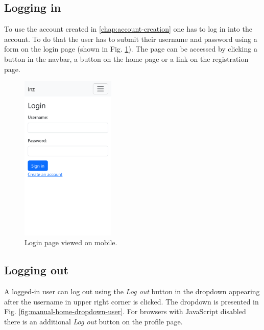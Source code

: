 \subsection{Logging in}

To use the account created in \ref{chap:account-creation} one has to log in into the account. To do that the user has to submit their username and password using a form on the login page (shown in Fig. \ref{fig:manual-login}). The page can be accessed by clicking a button in the navbar, a button on the home page or a link on the registration page.

\begin{figure}
    \centering
    \includegraphics[width=0.4\textwidth]{img/manual-login.png}
    \caption{Login page viewed on mobile.}
    \label{fig:manual-login}
\end{figure}

\subsection{Logging out}

A logged-in user can log out using the \textit{Log out} button in the dropdown appearing after the username in upper right corner is clicked. The dropdown is presented in Fig. \ref{fig:manual-home-dropdown-user}. For browsers with JavaScript disabled there is an additional \textit{Log out} button on the profile page.

